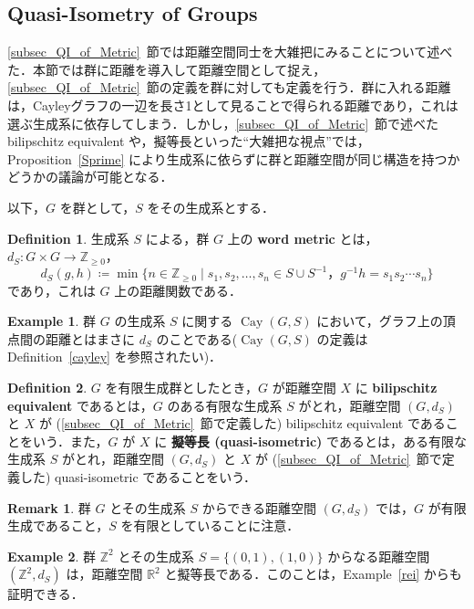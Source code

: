 \documentclass[dvipdfmx]{ujarticle}
\DeclareMathOperator{\Cay}{Cay}
\theoremstyle{definition}
\newtheorem{dfn}{Definition}[section]
\newtheorem*{rem*}{Remark}
\newtheorem*{ex*}{Example}
\begin{document}
\subsection{Quasi-Isometry of Groups}
\ref{subsec_QI_of_Metric}~節では距離空間同士を大雑把にみることについて述べた．本節では群に距離を導入して距離空間として捉え，\ref{subsec_QI_of_Metric}~節の定義を群に対しても定義を行う．群に入れる距離は，Cayleyグラフの一辺を長さ1として見ることで得られる距離であり，これは選ぶ生成系に依存してしまう．しかし，\ref{subsec_QI_of_Metric}~節で述べた bilipschitz equivalent や，擬等長といった``大雑把な視点''では， Proposition~\ref{Sprime} により生成系に依らずに群と距離空間が同じ構造を持つかどうかの議論が可能となる．

以下，$G$ を群として，$S$ をその生成系とする．
\begin{dfn}
生成系 $S$ による，群 $G$ 上の \textbf{word metric} とは，$d_S\colon G\times G\rightarrow \mathbb{Z}_{\geq 0}$，
 $$d_S(g,h)\coloneqq\min\{n\in\mathbb{Z}_{\geq 0}\mid s_1,s_2,\ldots, s_n\in S\cup S^{-1}，g^{-1}h=s_1s_2\cdots s_n\}$$
であり，これは $G$ 上の距離関数である．
\end{dfn}

\begin{ex*}
  群 $G$ の生成系 $S$ に関する $\Cay(G,S)$ において，グラフ上の頂点間の距離とはまさに $d_S$ のことである($\Cay(G,S)$ の定義は Definition~\ref{cayley} を参照されたい)．
\end{ex*}

\begin{dfn}\label{GQIX}
$G$ を有限生成群としたとき，$G$ が距離空間 $X$ に \textbf{bilipschitz equivalent} であるとは，$G$ のある有限な生成系 $S$ がとれ，距離空間 $(G,d_S)$ と $X$ が (\ref{subsec_QI_of_Metric}~節で定義した) bilipschitz equivalent であることをいう．また，$G$ が $X$ に \textbf{擬等長 (quasi-isometric)} であるとは，ある有限な生成系 $S$ がとれ，距離空間 $(G,d_S)$ と $X$ が (\ref{subsec_QI_of_Metric}~節で定義した) quasi-isometric であることをいう．
\end{dfn}

\begin{rem*}
  群 $G$ とその生成系 $S$ からできる距離空間 $(G,d_S)$ では，$G$ が有限生成であること，$S$ を有限としていることに注意．
\end{rem*}

\begin{ex*}
  群 $\mathbb{Z}^2$ とその生成系 $S=\{(0,1),(1,0)\}$ からなる距離空間 $(\mathbb{Z}^2,d_S)$ は，距離空間 $\mathbb{R}^2$ と擬等長である．このことは，Example~\ref{rei} からも証明できる．
\end{ex*}
\end{document}
